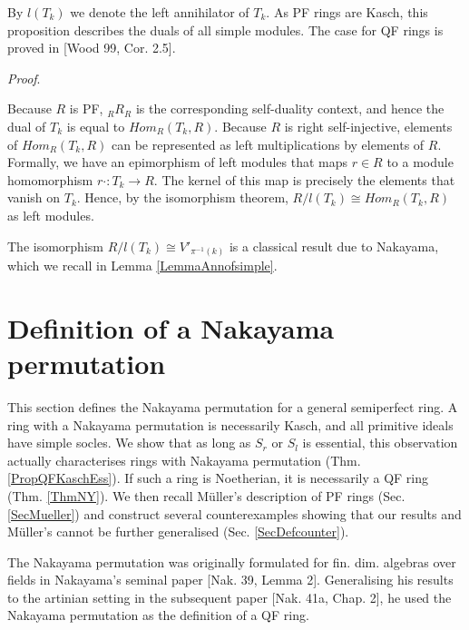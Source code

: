 \documentclass[11pt]{article}
\theoremstyle{plain}
\theoremstyle{remark}
\theoremstyle{plain}
\newenvironment{Proof}{
  \par\medskip\noindent
  \textit{Proof}.
}{
\newline
\rightline{$\qedsymbol$}
}
\begin{document}
By $l(T_k)$ we denote the left annihilator of $T_k$. As PF rings are Kasch, this proposition describes the duals of all simple modules. The case for QF rings is proved in [Wood 99, Cor. 2.5].
\begin{Proof}
Because $R$ is PF, $_RR_R$ is the corresponding self-duality context, and hence the dual of $T_k$ is equal to $Hom_R(T_k, R)$. Because $R$ is right self-injective,  elements of  $Hom_R(T_k, R)$ can be represented as left multiplications by elements of $R$. Formally, we have an epimorphism of left modules that maps $r\in R$ to a module homomorphism $r\cdot \colon T_k\to R$. The kernel of this map is precisely the elements that vanish on $T_k$. Hence, by the isomorphism theorem, $R/l(T_k)\cong Hom_R(T_k, R)$ as left modules.

The isomorphism $R/l(T_k)\cong V'_{\pi^{-1}(k)}$ is a classical result due to Nakayama, which we recall in Lemma \ref{LemmaAnnofsimple}.
    \end{Proof}





\section{Definition of a Nakayama permutation}\label{SecDef}

This section defines the Nakayama permutation for a general semiperfect ring. A ring with a Nakayama permutation is necessarily Kasch, and all primitive ideals have simple socles. We show that as long as $S_r$ or $S_l$ is essential, this observation actually characterises rings with Nakayama permutation (Thm. \ref{PropQFKaschEss}). If such a ring is Noetherian, it is necessarily a QF ring (Thm. \ref{ThmNY}). We then recall Müller's description of PF rings (Sec. \ref{SecMueller}) and construct several counterexamples showing that our results and Müller's cannot be further generalised (Sec. \ref{SecDefcounter}). 


\smallskip 

The Nakayama permutation was originally formulated for fin. dim. algebras over fields in Nakayama's seminal paper [Nak. 39, Lemma 2]. Generalising his results to the artinian setting in the subsequent paper [Nak. 41a, Chap. 2], he used the Nakayama permutation as the definition of a QF ring. 
\end{document}
